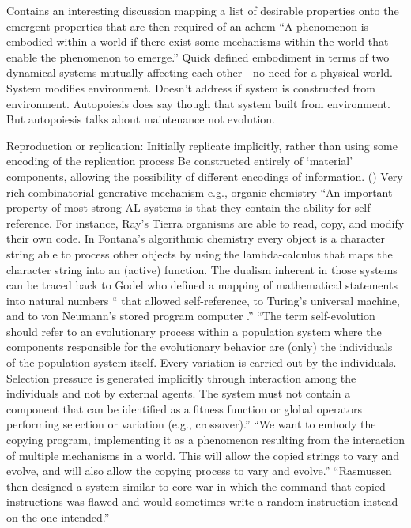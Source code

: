 Contains an interesting discussion mapping a list of desirable properties onto the emergent properties that are then required of an \gls{achem} \parencite{Faulconbridge2010, Faulconbridge2011}
``A phenomenon is embodied within a world if there exist some mechanisms within the world that enable the phenomenon to emerge.'' \cite{Nellis2014}
Quick defined embodiment in terms of two dynamical systems mutually affecting each other - no need for a physical world. System modifies environment. Doesn't address if system is constructed from environment. Autopoiesis does say though that system built from environment. But autopoiesis talks about maintenance not evolution. \parencite{Nellis2014}

Reproduction or replication:
Initially replicate implicitly, rather than using some encoding of the replication process  \parencite{Taylor2001}
Be constructed entirely of `material' components, allowing the possibility of different encodings of information. ()
Very rich combinatorial generative mechanism e.g., organic chemistry \parencite{Vasas2015}
``An important property of most strong AL systems is that they contain the ability for self-reference. For instance, Ray's Tierra organisms are able to read, copy, and modify their own code. In Fontana's algorithmic chemistry every object is a character string able to process other objects by using the lambda-calculus that maps the character string into an (active) function. The dualism inherent in those systems can be traced back to Godel who defined a mapping of mathematical statements into natural numbers `` that allowed self-reference, to Turing's universal machine, and to von Neumann's stored program computer .''\parencite{Dittrich1998}
``The term self-evolution should refer to an evolutionary process within a population system where the components responsible for the evolutionary behavior are (only) the individuals of the population
system itself. Every variation is carried out by the individuals. Selection pressure is generated implicitly through interaction among the individuals and not by external agents. The system must not contain a component that can be identified as a fitness function or global operators performing selection or variation (e.g., crossover).'' \cite{Dittrich1998}
``We want to embody the copying program, implementing it as a phenomenon resulting from the interaction of multiple mechanisms in a world. This will allow the copied strings to vary and evolve, and will also allow the copying process to vary and evolve.'' \cite{Nellis2014}
``Rasmussen then designed a system similar to core war in which the command that copied instructions was flawed and would sometimes write a random instruction instead on the one intended.'' \parencite{Ofria2004}

